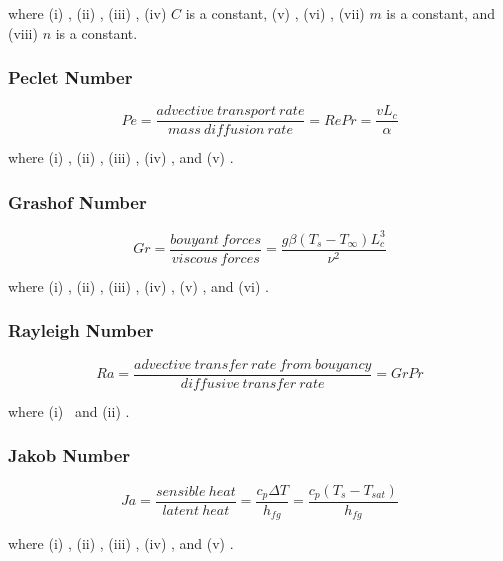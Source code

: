 \documentclass{article}
\begin{document}
where (i) \convectiveheattransfercoeff, (ii) \characteristiclength, (iii) \fluidthermalconductivity, (iv) $C$ is a constant, (v) \reynoldsnumber, (vi) \prandtlnumber, (vii) $m$ is a constant, and (viii) $n$ is a constant.

\subsubsection{Peclet Number}\label{sec:pe}
\begin{equation}
    Pe = \frac{advective\ transport\ rate}{mass\ diffusion\ rate} =
    RePr = 
    \frac{v L_c}{\alpha}
\end{equation}

where (i) \reynoldsnumber, (ii) \prandtlnumber, (iii) \flowvelocity, (iv) \characteristiclength, and (v) \thermaldiffusivity.

\subsubsection{Grashof Number}\label{sec:gr}
\begin{equation}
    Gr = \frac{bouyant\ forces}{viscous\ forces} =
    \frac{g \beta \left(T_s - T_{\infty} \right) L_c^3}{\nu^2}
\end{equation}

where (i) \gravity, (ii) \thermalexpansion, (iii) \surfacetemperature, (iv) \bulktemperature, (v) \characteristiclength, and (vi) \kinematicviscosity.

\subsubsection{Rayleigh Number}\label{sec:ra}
\begin{equation}
    Ra = \frac{advective\ transfer\ rate\ from\ bouyancy}{diffusive\ transfer\ rate} = 
    GrPr
\end{equation}

where (i) \grashofnumber \ and (ii) \prandtlnumber.

\subsubsection{Jakob Number}\label{sec:ja}
\begin{equation}
    Ja = \frac{sensible\ heat}{latent\ heat} = 
    \frac{c_p \Delta T}{h_{fg}} = 
    \frac{c_p \left(T_s - T_{sat} \right)}{h_{fg}}
\end{equation}

where (i) \specificheat, (ii) \deltatemperature, (iii) \evaporationenthalpy, (iv) \surfacetemperature, and (v) \saturationtemp.
\end{document}
